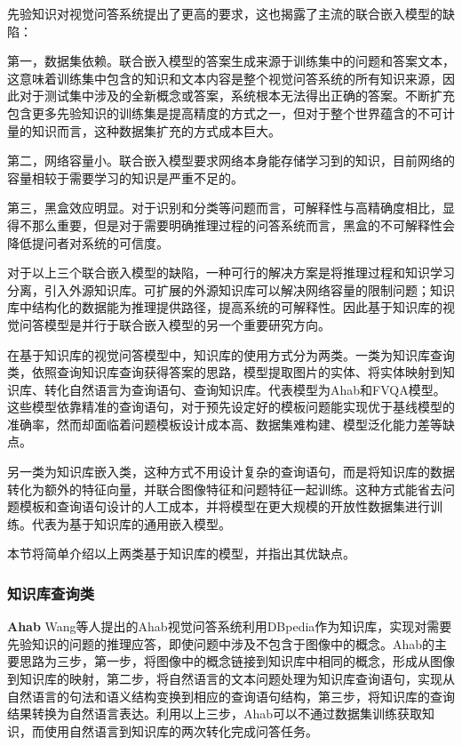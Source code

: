 先验知识对视觉问答系统提出了更高的要求，这也揭露了主流的联合嵌入模型的缺陷：

第一，数据集依赖。联合嵌入模型的答案生成来源于训练集中的问题和答案文本，这意味着训练集中包含的知识和文本内容是整个视觉问答系统的所有知识来源，因此对于测试集中涉及的全新概念或答案，系统根本无法得出正确的答案。不断扩充包含更多先验知识的训练集是提高精度的方式之一，但对于整个世界蕴含的不可计量的知识而言，这种数据集扩充的方式成本巨大。

第二，网络容量小。联合嵌入模型要求网络本身能存储学习到的知识，目前网络的容量相较于需要学习的知识是严重不足的。

第三，黑盒效应明显。对于识别和分类等问题而言，可解释性与高精确度相比，显得不那么重要，但是对于需要明确推理过程的问答系统而言，黑盒的不可解释性会降低提问者对系统的可信度。

对于以上三个联合嵌入模型的缺陷，一种可行的解决方案是将推理过程和知识学习分离，引入外源知识库。可扩展的外源知识库可以解决网络容量的限制问题；知识库中结构化的数据能为推理提供路径，提高系统的可解释性。因此基于知识库的视觉问答模型是并行于联合嵌入模型的另一个重要研究方向。

在基于知识库的视觉问答模型中，知识库的使用方式分为两类。一类为知识库查询类，依照查询知识库查询获得答案的思路，模型提取图片的实体、将实体映射到知识库、转化自然语言为查询语句、查询知识库。代表模型为Ahab和FVQA模型。这些模型依靠精准的查询语句，对于预先设定好的模板问题能实现优于基线模型的准确率，然而却面临着问题模板设计成本高、数据集难构建、模型泛化能力差等缺点。

另一类为知识库嵌入类，这种方式不用设计复杂的查询语句，而是将知识库的数据转化为额外的特征向量，并联合图像特征和问题特征一起训练。这种方式能省去问题模板和查询语句设计的人工成本，并将模型在更大规模的开放性数据集进行训练。代表为基于知识库的通用嵌入模型。

本节将简单介绍以上两类基于知识库的模型，并指出其优缺点。

\subsubsection{知识库查询类}

\textbf{Ahab}
Wang等人提出的Ahab视觉问答系统利用DBpedia作为知识库，实现对需要先验知识的问题的推理应答，即使问题中涉及不包含于图像中的概念。Ahab的主要思路为三步，第一步，将图像中的概念链接到知识库中相同的概念，形成从图像到知识库的映射，第二步，将自然语言的文本问题处理为知识库查询语句，实现从自然语言的句法和语义结构变换到相应的查询语句结构，第三步，将知识库的查询结果转换为自然语言表达。利用以上三步，Ahab可以不通过数据集训练获取知识，而使用自然语言到知识库的两次转化完成问答任务。

